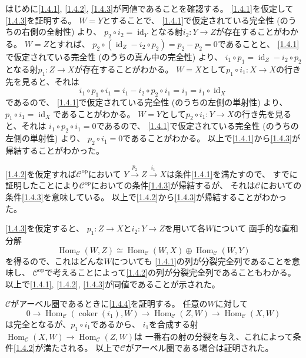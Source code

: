 \documentclass[uplatex,dvipdfmx]{jsarticle}
\makeatletter
\theoremstyle{definition}
\renewenvironment{proof}[1][\proofname]{
  \pushQED{\qed}%
  \normalfont \topsep6\p@\@plus6\p@\relax
  \trivlist
  \item[\hskip\labelsep
    #1\@addpunct{\textbf{.}}]\ignorespaces
}{%
  \popQED\endtrivlist\@endpefalse
}
\providecommand{\proofname}{証明}
\DeclareMathOperator{\Hom}{\mathrm{Hom}}
\DeclareMathOperator{\id}{\mathrm{id}}
\newcommand{\op}{\mathrm{op}}
\DeclareMathOperator{\coker}{\mathrm{coker}}
\newcommand\mcC{\mathcal{C}}
\makeatother
\begin{document}
\begin{proof}
  はじめに\ref{1.4.1}, \ref{1.4.2}, \ref{1.4.3}が同値であることを確認する。
  \ref{1.4.1}を仮定して\ref{1.4.3}を証明する。
  \(W=Y\)とすることで、
  \ref{1.4.1}で仮定されている完全性 (のうちの右側の全射性) より、
  \(p_2\circ i_2 = \id_Y\)となる射\(i_2:Y\to Z\)が存在することがわかる。
  \(W=Z\)とすれば、
  \(p_2\circ (\id_Z - i_2\circ p_2) = p_2 - p_2 = 0\)であることと、
  \ref{1.4.1}で仮定されている完全性 (のうちの真ん中の完全性) より、
  \(i_1\circ p_1 = \id_Z - i_2\circ p_2\)
  となる射\(p_1:Z\to X\)が存在することがわかる。
  \(W=X\)として\(p_1\circ i_1 :X\to X\)の行き先を見ると、それは
  \[
  i_1\circ p_1 \circ i_1
  = i_1 - i_2\circ p_2 \circ i_1 = i_1 = i_1 \circ \id_X
  \]
  であるので、
  \ref{1.4.1}で仮定されている完全性 (のうちの左側の単射性) より、
  \(p_1\circ i_1 = \id_X\)であることがわかる。
  \(W=Y\)として\(p_2\circ i_1 : Y\to X\)の行き先を見ると、それは
  \(i_1\circ p_2\circ i_1 = 0\)であるので、
  \ref{1.4.1}で仮定されている完全性 (のうちの左側の単射性) より、
  \(p_2\circ i_1 = 0\)であることがわかる。
  以上で\ref{1.4.1}から\ref{1.4.3}が帰結することがわかった。

  \ref{1.4.2}を仮定すれば\(\mcC^{\op}\)において
  \(Y\xrightarrow{p_2}Z \xrightarrow{i_1}X\)は条件\ref{1.4.1}を満たすので、
  すでに証明したことにより\(\mcC^{\op}\)においての条件\ref{1.4.3}が帰結するが、
  それは\(\mcC\)においての条件\ref{1.4.3}を意味している。
  以上で\ref{1.4.2}から\ref{1.4.3}が帰結することがわかった。

  \ref{1.4.3}を仮定すると、
  \(p_1:Z\to X\)と\(i_2:Y\to Z\)を用いて各\(W\)について
  函手的な直和分解
  \[
  \Hom_{\mcC}(W,Z) \cong \Hom_{\mcC}(W,X)\oplus \Hom_{\mcC}(W,Y)
  \]
  を得るので、これはどんな\(W\)についても
  \ref{1.4.1}の列が分裂完全列であることを意味し、
  \(\mcC^{\op}\)で考えることによって\ref{1.4.2}の列が分裂完全列であることもわかる。
  以上で\ref{1.4.1}, \ref{1.4.2}, \ref{1.4.3}が同値であることが示された。

  \(\mcC\)がアーベル圏であるときに\ref{1.4.4}を証明する。
  任意の\(W\)に対して
  \[
  0\to \Hom_{\mcC}(\coker(i_1),W) \to \Hom_{\mcC}(Z,W) \to \Hom_{\mcC}(X,W)
  \]
  は完全となるが、\(p_1\circ i_1\)であるから、
  \(i_1\)を合成する射\(\Hom_{\mcC}(X,W) \to \Hom_{\mcC}(Z,W)\)は
  一番右の射の分裂を与え、これによって条件\ref{1.4.2}が満たされる。
  以上で\(\mcC\)がアーベル圏である場合は証明された。


\end{proof}
\end{document}
